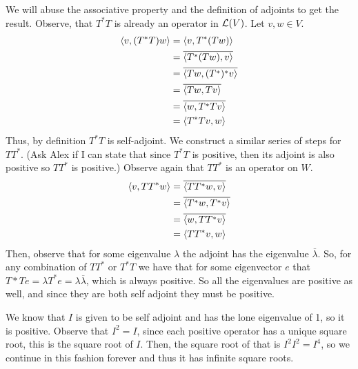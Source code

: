 \documentclass[10pt, twocolumn]{article}
\begin{document}
\begin{q}[4]
    We will abuse the associative property and the definition of adjoints to get the result. 
    Observe, that $ T^*T $ is already an operator in $ \mathcal{L}(V) $. Let $ v, w \in V $.
    \begin{align*}
        \langle v, (T^* T) w\rangle &= \langle v, T^* (Tw)\rangle \\
        &= \overline{ \langle T^* (Tw), v\rangle } \\
        &= \overline{\langle Tw, (T^*)^* v\rangle} \\
        &= \overline{\langle Tw, Tv\rangle} \\
        &= \overline{\langle w, T^*Tv\rangle} \\
        &= \langle T^* Tv, w\rangle
    \end{align*}
    Thus, by definition $ T^*T $ is self-adjoint.
    We construct a similar series of steps for $ TT^* $. 
    (Ask Alex if I can state that since $ T^*T $ is positive, then its adjoint is also positive so $ TT^* $ is positive.)
    Observe again that $ TT^* $ is an operator on $ W $. 
    \begin{align*}
        \langle v, TT^* w\rangle &= \overline{\langle TT^* w, v\rangle} \\
        &= \overline{\langle T^* w, T^* v\rangle} \\
        &= \overline{\langle w, TT^* v\rangle} \\
        &= \langle TT^* v, w\rangle
    \end{align*}
    Then, observe that for some eigenvalue $ \lambda $ the adjoint has the eigenvalue $ \overline{\lambda} $. 
    So, for any combination of $ TT^* $ or $ T^*T $ we have that for some eigenvector $ e $ that $ T*Te = \lambda T^*e = \lambda \overline{\lambda} $, which is always positive.
    So all the eigenvalues are positive as well, and since they are both self adjoint they must be positive.
\end{q}

\begin{q}[7]

\end{q}

\begin{q}[8]
    
\end{q}

\begin{q}[9]
    We know that $ I $ is given to be self adjoint and has the lone eigenvalue of 1, so it is positive.
    Observe that $ I^2 = I $, since each positive operator has a unique square root, this is the square root of $ I $. 
    Then, the square root of  that  is $ I^2 I^2 = I^4 $, so we continue in this fashion forever and thus it has infinite square roots.
\end{q}

\begin{q}[11]
    
\end{q}
\end{document}
